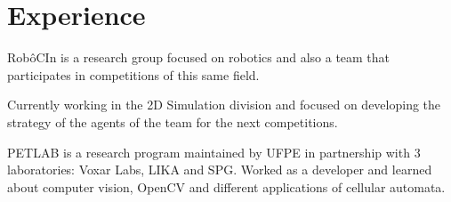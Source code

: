 \documentclass[]{deedy-resume-openfont}
\begin{document}
\begin{minipage}[t]{0.33\textwidth}
\sectionsep



%
%

\end{minipage} 
\hfill
\begin{minipage}[t]{0.66\textwidth} 


\section{Experience}

\vspace{\topsep} %
\begin{tightemize}
\item RobôCIn is a research group focused on robotics and also a team that participates in competitions of this same field.
\item Currently working in the 2D Simulation division and focused on developing the strategy of the agents of the team for the next competitions.
\end{tightemize}


\begin{tightemize}
\item PETLAB is a research program maintained by UFPE in partnership with 3 laboratories: Voxar Labs, LIKA and SPG. Worked as a developer and learned about computer vision, OpenCV and  different applications of cellular automata.
\end{tightemize}


\end{minipage}
\end{document}
